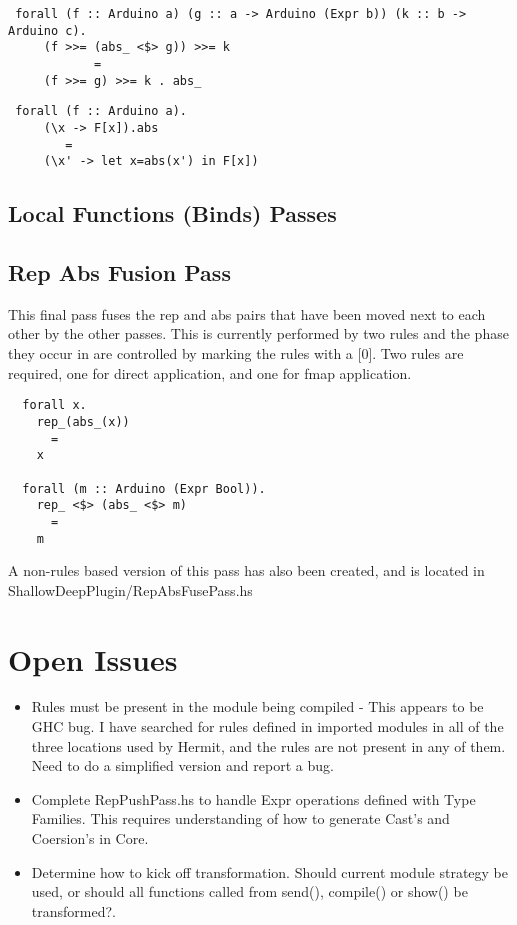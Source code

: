 \documentclass[11pt, oneside]{article}   	%
\begin{document}
\begin{verbatim}
 forall (f :: Arduino a) (g :: a -> Arduino (Expr b)) (k :: b -> Arduino c).
     (f >>= (abs_ <$> g)) >>= k
            =
     (f >>= g) >>= k . abs_
\end{verbatim}

\begin{verbatim}
 forall (f :: Arduino a).
     (\x -> F[x]).abs
        =
     (\x' -> let x=abs(x') in F[x])
\end{verbatim}

\subsection{Local Functions (Binds) Passes}

\subsection{Rep Abs Fusion Pass}

This final pass fuses the rep and abs pairs that have been moved next
to each other by the other passes.  This is currently performed by
two rules and the phase they occur in are controlled by marking the rules
with a [0].  Two rules are required, one for direct application, and one for
fmap application.

\begin{verbatim}
  forall x.
    rep_(abs_(x))
      =
    x

  forall (m :: Arduino (Expr Bool)).
    rep_ <$> (abs_ <$> m)
      =
    m
\end{verbatim}

A non-rules based version of this pass has also been created, and is
located in ShallowDeepPlugin/RepAbsFusePass.hs

\section{Open Issues}

\begin{itemize}
  \item Rules must be present in the module being compiled - This appears to be 
  GHC bug.  I have searched for rules defined in imported modules in all of the
  three locations used by Hermit, and the rules are not present in any of them. 
  Need to do a simplified version and report a bug.
  \item Complete RepPushPass.hs to handle Expr operations defined with
  Type Families.  This requires understanding of how to generate Cast's and
  Coersion's in Core.
  \item Determine how to kick off transformation.  Should current module 
  strategy be used, or should all functions called from send(), compile() or
  show() be transformed?.
\end{itemize}
\end{document}
